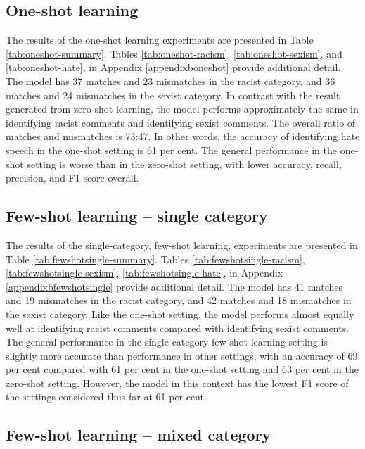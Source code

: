 \documentclass{bmcart}
\begin{document}
\subsection{One-shot learning}\label{one-shot-learning-1}

The results of the one-shot learning experiments are presented in Table \ref{tab:oneshot-summary}. Tables \ref{tab:oneshot-racism}, \ref{tab:oneshot-sexism}, and \ref{tab:oneshot-hate}, in Appendix \ref{appendixboneshot} provide additional detail. The model has 37 matches and 23 mismatches in the racist category, and 36 matches and 24 mismatches in the sexist category. In contrast with the result generated from zero-shot learning, the model performs approximately the same in identifying racist comments and identifying sexist comments. The overall ratio of matches and mismatches is 73:47. In other words, the accuracy of identifying hate speech in the one-shot setting is 61 per cent. The general performance in the one-shot setting is worse than in the zero-shot setting, with lower accuracy, recall, precision, and F1 score overall.


\subsection{Few-shot learning -- single category}\label{few-shot-learning-single-category}

The results of the single-category, few-shot learning, experiments are presented in Table \ref{tab:fewshotsingle-summary}. Tables \ref{tab:fewshotsingle-racism}, \ref{tab:fewshotsingle-sexism}, \ref{tab:fewshotsingle-hate}, in Appendix \ref{appendixbfewshotsingle} provide additional detail. The model has 41 matches and 19 mismatches in the racist category, and 42 matches and 18 mismatches in the sexist category. Like the one-shot setting, the model performs almost equally well at identifying racist comments compared with identifying sexist comments. The general performance in the single-category few-shot learning setting is slightly more accurate than performance in other settings, with an accuracy of 69 per cent compared with 61 per cent in the one-shot setting and 63 per cent in the zero-shot setting. However, the model in this context has the lowest F1 score of the settings considered thus far at 61 per cent.


\subsection{Few-shot learning -- mixed category}\label{few-shot-learning-mixed-category}
\end{document}
